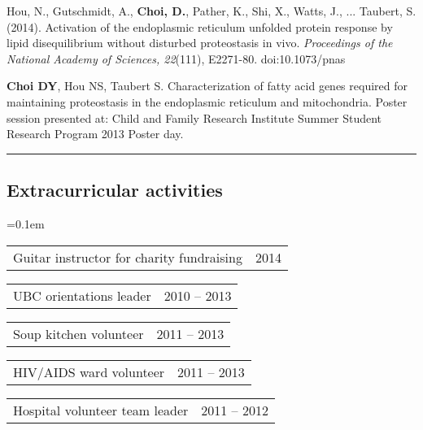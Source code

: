 \documentclass[10pt,letterpaper]{article}
\makeatletter
\newenvironment{indentsection}[1]%
{\begin{list}{}%
	{\setlength{\leftmargin}{#1}}%
	\item[]%
}
{\end{list}}
\newcommand{\headerrow}[2]
{\begin{tabular*}{\linewidth}{l@{\extracolsep{\fill}}r}
	#1 &
	#2 \\
\end{tabular*}}
\makeatother
\begin{document}
\begin{indentsection}{\parindent}
\begin{description*}
	\item
	Hou, N., Gutschmidt, A., \textbf{Choi, D.}, Pather, K., Shi, X., Watts, J., ... Taubert, S. 
	(2014). Activation of the endoplasmic reticulum unfolded protein response by 
	lipid disequilibrium without disturbed proteostasis in vivo. \textit{Proceedings of the 
	National Academy of Sciences, 22}(111), E2271-80. doi:10.1073/pnas
	\item
	\textbf{Choi DY}, Hou NS, Taubert S. Characterization of fatty acid genes required for 
	maintaining proteostasis in the endoplasmic reticulum and mitochondria. Poster 
	session presented at: Child and Family Research Institute Summer Student Research 
	Program 2013 Poster day.
\end{description*}
\end{indentsection}
\hrule
\vspace{-0.4em}

\subsection*{Extracurricular activities}

\begin{itemize*}
	\parskip=0.1em
	\item 
	\headerrow
		{{Guitar instructor for charity fundraising}}
		{{2014}}
	\item 
	\headerrow
		{{UBC orientations leader}}
		{{2010 -- 2013}}
	\item 
	\headerrow
		{{Soup kitchen volunteer}}
		{{2011 -- 2013}}
	\item 
	\headerrow
		{{HIV/AIDS ward volunteer}}
		{{2011 -- 2013}}
	\item 
	\headerrow
		{{Hospital volunteer team leader}}
		{{2011 -- 2012}}
\end{itemize*}
\vspace{-0.4em}
\end{document}
